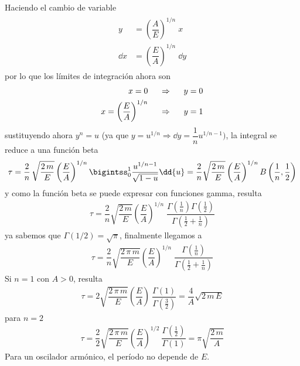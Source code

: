 Haciendo el cambio de variable
\begin{align}
\begin{aligned}
y &= \left( \dfrac{A}{E} \right)^{1/n} \; x \\
\dd{x} &= \left( \dfrac{E}{A} \right)^{1/n} \; \dd{y}
\end{aligned}
\end{align}
por lo que los límites de integración ahora son
\begin{align}
\begin{aligned}
x = 0 & \hspace{0.5cm} \Rightarrow \hspace{0.5cm} y = 0 \\
x = \left( \dfrac{E}{A} \right)^{1/n} & \hspace{0.5cm} \Rightarrow \hspace{0.5cm} y = 1
\end{aligned}
\end{align}
sustituyendo ahora $y^{n} = u$ (ya que $y = u^{1/n} \Rightarrow \dd{y} = \dfrac{1}{n} u^{1/n - 1})$, la integral se reduce a una función beta
\begin{align*}
\tau = \dfrac{2}{n} \, \sqrt{\dfrac{2 \, m}{E}} \left( \dfrac{E}{A} \right)^{1/n} \bigintss_{0}^{1} \dfrac{u^{1/n - 1}}{\sqrt{1 - u}} \dd{u}  = \dfrac{2}{n} \sqrt{\dfrac{2 \, m}{E}} \left( \dfrac{E}{A} \right)^{1/n} B \left( \dfrac{1}{n}, \dfrac{1}{2} \right)
\end{align*}
y como la función beta se puede expresar con funciones gamma, resulta
\begin{align*}
\tau = \dfrac{2}{n} \sqrt{\dfrac{2 \, m}{E}} \left( \dfrac{E}{A} \right)^{1/n} \; \dfrac{\Gamma \left( \frac{1}{n} \right) \Gamma \left( \frac{1}{2} \right) }{\Gamma \left( \frac{1}{2} + \frac{1}{n} \right)}
\end{align*}
ya sabemos que $\Gamma (1/2) = \sqrt{\pi}$, finalmente llegamos a
\begin{align*}
\tau = \dfrac{2}{n} \sqrt{\dfrac{2 \, \pi \, m}{E}} \left( \dfrac{E}{A} \right)^{1/n} \; \dfrac{\Gamma \left( \frac{1}{n} \right) }{\Gamma \left( \frac{1}{2} + \frac{1}{n} \right)}
\end{align*}
Si $n = 1 \mbox{ con } A > 0$, resulta
\begin{align*}
\tau = 2 \sqrt{\dfrac{2 \, \pi \, m }{E}} \left( \dfrac{E}{A} \right) \: \dfrac{\Gamma (1)}{\Gamma (\frac{3}{2})} = \dfrac{4}{A} \sqrt{2 \, m \, E}
\end{align*}
para $n = 2$
\begin{align*}
\tau = \dfrac{2}{2} \sqrt{\dfrac{2 \, \pi \, m }{E}} \left( \dfrac{E}{A} \right)^{1/2} \: \dfrac{\Gamma (\frac{1}{2})}{\Gamma (1)}  =  \pi \sqrt{\dfrac{2 \, m}{A}}
\end{align*}
Para un oscilador armónico, el período no depende de $E$.
\newpage
